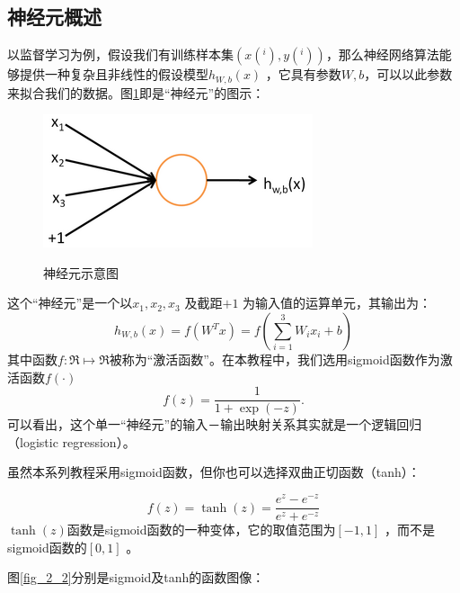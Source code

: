 \subsection{神经元概述}
以监督学习为例，假设我们有训练样本集$(x(^i),y(^i))$，那么神经网络算法能够提供一种复杂且非线性的假设模型$h_{W,b}(x)$ ，它具有参数$W, b$，可以以此参数来拟合我们的数据。图\ref{fig_2_1}即是“神经元”的图示：\par
\begin{figure}[htbp]
	\centering
	\includegraphics[scale=0.5]{figures/chapter_2/SingleNeuron.png}\\
	\caption{神经元示意图}\label{fig_2_1}
\end{figure}
这个“神经元”是一个以$x_1, x_2, x_3$ 及截距$+1$ 为输入值的运算单元，其输出为：
\begin{equation}
	h_{W,b}(x) = f(W^Tx) = f(\sum_{i=1}^3 W_{i}x_i +b)
\end{equation} 
其中函数$f : \Re \mapsto \Re$被称为“激活函数”。在本教程中，我们选用sigmoid函数作为激活函数$f(\cdot)$
\begin{equation}
	f(z) = \frac{1}{1+\exp(-z)}.
\end{equation}
可以看出，这个单一“神经元”的输入－输出映射关系其实就是一个逻辑回归（logistic regression）。\par
虽然本系列教程采用sigmoid函数，但你也可以选择双曲正切函数（tanh）：\par
\begin{equation}
f(z) = \tanh(z) = \frac{e^z - e^{-z}}{e^z + e^{-z}}
\end{equation}
$\tanh(z)$函数是sigmoid函数的一种变体，它的取值范围为$[-1,1]$ ，而不是sigmoid函数的$[0,1]$ 。\par
图\ref{fig_2_2}分别是sigmoid及tanh的函数图像：

